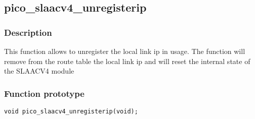 \subsection{pico\_slaacv4\_unregisterip}

\subsubsection*{Description}
This function allows to unregister the local link ip in usage. The function will remove from the route table
the local link ip and will reset the internal state of the SLAACV4 module

\subsubsection*{Function prototype}
\texttt{void pico\_slaacv4\_unregisterip(void);}

